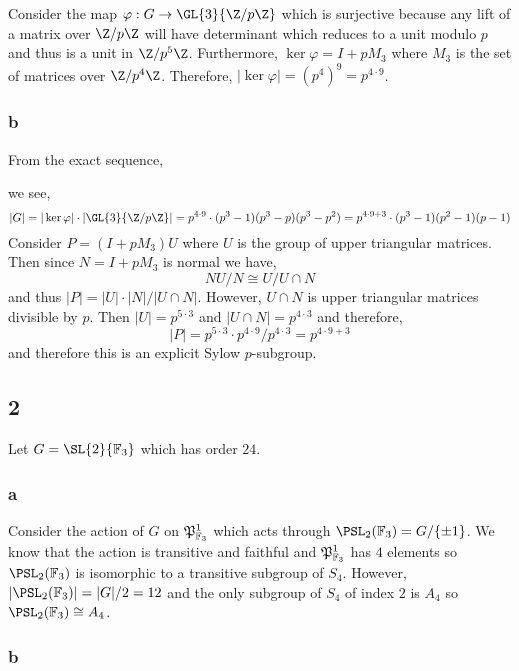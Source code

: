 \documentclass[12pt]{article}
\renewcommand{\F}{\mathbb{F}}
\begin{document}
Consider the map $\varphi : G \to \GL{3}{\Z/p \Z}$ which is surjective because any lift of a matrix over $\Z / p \Z$ will have determinant which reduces to a unit modulo $p$ and thus is a unit in $\Z / p^5 \Z$. Furthermore, $\ker{\varphi} = I + p M_3$ where $M_3$ is the set of matrices over $\Z / p^4 \Z$. Therefore, $|\ker{\varphi}| = (p^4)^9 = p^{4 \cdot 9}$.

\subsubsection{b}

From the exact sequence,
\begin{center}
\end{center}
we see,
\[ |G| = |\ker{\varphi}| \cdot |\GL{3}{\Z/p\Z}| = p^{4 \cdot 9} \cdot (p^3 - 1)(p^3 - p)(p^3 - p^2) = p^{4 \cdot 9 + 3} \cdot (p^3 - 1)(p^2 - 1)(p - 1) \]
Consider $P = (I + p M_3) U$ where $U$ is the group of upper triangular matrices. Then since $N = I + p M_3$ is normal we have,
\[ NU/N \cong U / U \cap N \]
and thus $|P| = |U| \cdot |N| /|U \cap N|$. However, $U \cap N$ is upper triangular matrices divisible by $p$. Then $|U| = p^{5 \cdot 3}$ and $|U \cap N| = p^{4 \cdot 3}$ and therefore,
\[ |P| = p^{5 \cdot 3} \cdot p^{4 \cdot 9} / p^{4 \cdot 3} = p^{4 \cdot 9 + 3} \]
and therefore this is an explicit Sylow $p$-subgroup.

\subsection{2}

Let $G = \SL{2}{\F_3}$ which has order $24$.

\subsubsection{a}

Consider the action of $G$ on $\P^1_{\F_3}$ which acts through $\PSL_{2}(\F_3) = G / \{ \pm 1 \}$. We know that the action is transitive and faithful and $\P^1_{\F_3}$ has $4$ elements so $\PSL_{2}(\F_3)$ is isomorphic to a transitive subgroup of $S_4$. However, $|\PSL_{2}(\F_3)| = |G|/2 = 12$ and the only subgroup of $S_4$ of index $2$ is $A_4$ so $\PSL_{2}(\F_3) \cong A_4$.

\subsubsection{b}
\end{document}
